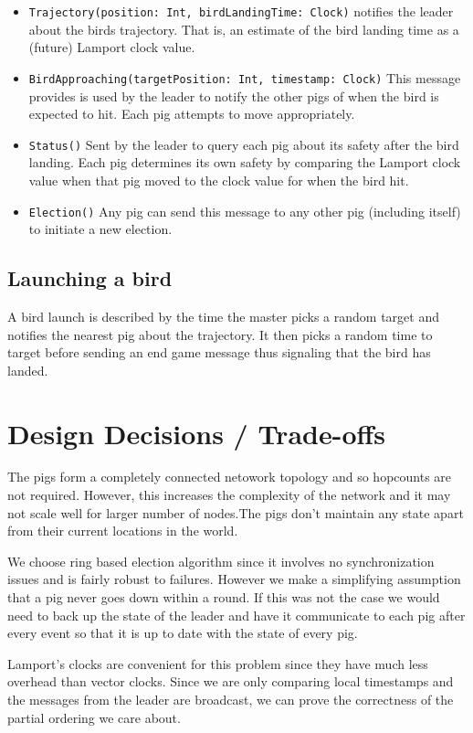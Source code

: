 \documentclass[]{article}
\begin{document}
\begin{itemize}
\item
  \texttt{Trajectory(position: Int, birdLandingTime: Clock)} notifies the leader about the birds trajectory. That is, an estimate of the bird landing time as a (future) Lamport clock value.
\item
  \texttt{BirdApproaching(targetPosition: Int, timestamp: Clock)} This message provides is used by the leader to notify the other pigs of when the bird is expected to hit. Each pig attempts to move appropriately.
\item
  \texttt{Status()} Sent by the leader to query each pig about its safety after the bird landing. Each pig determines its own safety by comparing the Lamport clock value when that pig moved to the clock value for when the bird hit.
\item
  \texttt{Election()} Any pig can send this message to any other pig (including itself) to initiate a new election.
\end{itemize}

\subsection{Launching a bird}

A bird launch is described by the time the master picks a random target
and notifies the nearest pig about the trajectory. It then picks a
random time to target before sending an end game message thus signaling
that the bird has landed.

\section{Design Decisions / Trade-offs}

The pigs form a completely connected netowork topology and so hopcounts are not
required. However, this increases the complexity of the network and it may not
scale well for larger number of nodes.The pigs don't maintain any state apart
from their current locations in the world.

We choose ring based election algorithm since it involves no synchronization
issues and is fairly robust to failures. However we make a simplifying
assumption that a pig never goes down within a round. If this was not the case
we would need to back up the state of the leader and have it communicate to
each pig after every event so that it is up to date with the state of every
pig.

Lamport's clocks are convenient for this problem since they have much less
overhead than vector clocks. Since we are only comparing local timestamps and
the messages from the leader are broadcast, we can prove the correctness of the
partial ordering we care about.
\end{document}

